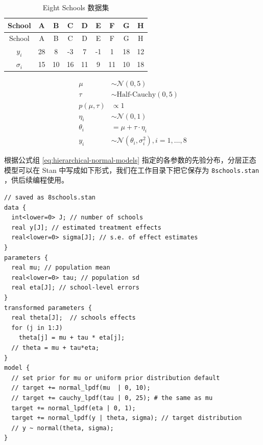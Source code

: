\documentclass[12pt,a4paper,UTF8,twoside]{book}
\theoremstyle{definition}
\theoremstyle{definition}
\theoremstyle{definition}
\theoremstyle{remark}
\begin{document}
\begin{longtable}[]{@{}ccccccccc@{}}
\caption{\label{tab:eight-high-schools} Eight Schools 数据集}\tabularnewline
\toprule
School & A & B & C & D & E & F & G & H\tabularnewline
\midrule
\endfirsthead
\toprule
School & A & B & C & D & E & F & G & H\tabularnewline
\midrule
\endhead
\(y_i\) & 28 & 8 & -3 & 7 & -1 & 1 & 18 & 12\tabularnewline
\(\sigma_i\) & 15 & 10 & 16 & 11 & 9 & 11 & 10 & 18\tabularnewline
\bottomrule
\end{longtable}

\begin{equation}
\begin{aligned}
     \mu & \sim \mathcal{N}(0,5) \\
    \tau & \sim \text{Half-Cauchy}(0,5) \\
p(\mu,\tau) & \propto 1 \\
  \eta_i & \sim \mathcal{N}(0,1) \\
\theta_i &  =   \mu + \tau \cdot \eta_i \\
     y_i & \sim \mathcal{N}(\theta_i,\sigma^2_{i}), i = 1,\ldots,8
\end{aligned}
\label{eq:hierarchical-normal-models}
\end{equation}

根据公式组 \eqref{eq:hierarchical-normal-models}
指定的各参数的先验分布，分层正态模型可以在 Stan
中写成如下形式，我们在工作目录下把它保存为 \texttt{8schools.stan}
，供后续编程使用。

\begin{verbatim}
// saved as 8schools.stan
data {
  int<lower=0> J; // number of schools 
  real y[J]; // estimated treatment effects
  real<lower=0> sigma[J]; // s.e. of effect estimates 
}
parameters {
  real mu; // population mean
  real<lower=0> tau; // population sd
  real eta[J]; // school-level errors
}
transformed parameters {
  real theta[J];  // schools effects
  for (j in 1:J)
    theta[j] = mu + tau * eta[j];
  // theta = mu + tau*eta;
}
model {
  // set prior for mu or uniform prior distribution default
  // target += normal_lpdf(mu  | 0, 10); 
  // target += cauchy_lpdf(tau | 0, 25); # the same as mu
  target += normal_lpdf(eta | 0, 1);
  target += normal_lpdf(y | theta, sigma); // target distribution
  // y ~ normal(theta, sigma);
}
\end{verbatim}
\end{document}
